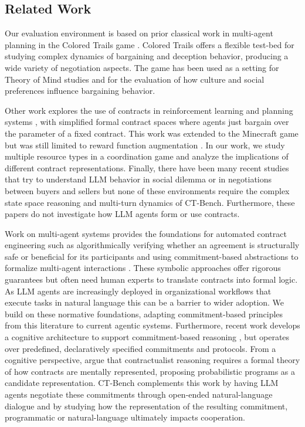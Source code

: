 \documentclass{article} %
\newcommand{\CT}{CT-Bench\xspace}
\begin{document}
\subsection{Related Work}
\label{sec:related_work}

Our evaluation environment is based on prior classical work in multi-agent planning in the Colored Trails game \citep{grosz2004influence, gal2004learning}. Colored Trails offers a flexible test-bed for studying complex dynamics of bargaining and deception behavior, producing a wide variety of negotiation aspects. The game has been used as a setting for Theory of Mind studies \citep{deWeerd2017theoryofmind, li2025combining} and for the evaluation of how culture and social preferences influence bargaining behavior.
%

Other work explores the use of contracts in reinforcement learning and planning systems \citep{haupt2024formal, oldenburg2024learning}, with simplified formal contract spaces where agents just bargain over the parameter of a fixed contract. This work was extended to the Minecraft game but was still limited to reward function augmentation  \citep{yocum2023mitigating}. In our work, we study multiple resource types in a coordination game and analyze the implications of different contract representations. Finally, there have been many recent studies that try to understand LLM behavior in social dilemma or in negotiations between buyers and sellers but none of these environments require the complex state space reasoning and multi-turn dynamics of \CT \citep{piatti2024cooperate,liu2026agenticpay,qian2025strategic,deng2024llms,zhu2025automated,he2018decoupling,xia2024measuring}. Furthermore, these papers do not investigate how LLM agents form or use contracts. 

Work on multi-agent systems provides the foundations for automated contract engineering such as algorithmically verifying whether an agreement is structurally safe or beneficial for its participants \citep{singh1999ontology, desai2008checking} and using commitment-based abstractions to formalize multi-agent interactions \citep{chopra2006contextualizing}. These symbolic approaches offer rigorous guarantees but often need human experts to translate contracts into formal logic. As LLM agents are increasingly deployed in organizational workflows that execute tasks in natural language this can be a barrier to wider adoption. We build on these normative foundations, adapting commitment-based principles from this literature to current agentic systems. Furthermore, recent work develops a cognitive architecture to support commitment-based reasoning \citep{chopra2025azorus}, but operates over predefined, declaratively specified commitments and protocols. From a cognitive perspective, \citep{Chandra_Kleiman-Weiner_2026} argue that contractualist reasoning requires a formal theory of how contracts are mentally represented, proposing probabilistic programs as a candidate representation. CT-Bench complements this work by having LLM agents negotiate these commitments through open-ended natural-language dialogue and by studying how the representation of the resulting commitment, programmatic or natural-language ultimately impacts cooperation.
\end{document}
